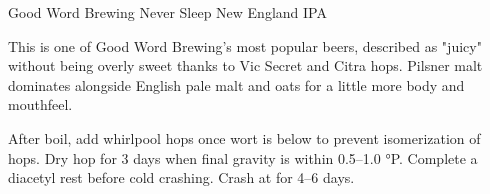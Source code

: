 \begin{recipie}{Good Word Brewing Never Sleep New England IPA}

\begin{aboutblock}
This is one of Good Word Brewing's most popular beers, described as "juicy" without
being overly sweet thanks to Vic Secret and Citra hops. Pilsner malt dominates
alongside English pale malt and oats for a little more body and mouthfeel.
\end{aboutblock}


\begin{methodandtiming}
 
\begin{mashsteps}
\end{mashsteps}

\begin{fermentationsteps}
\end{fermentationsteps}

\begin{directions}
After boil, add whirlpool hops once wort is below  to prevent isomerization
of hops. Dry hop for 3 days when final gravity is within 0.5--1.0 °P. Complete a
diacetyl rest before cold crashing. Crash at  for 4--6 days.
\end{directions}

\end{methodandtiming}

\pagebreak

\begin{ingredientsblock}

\begin{malts}
\end{malts}

\begin{hops}
\end{hops}

\begin{yeasts}
\end{yeasts}

\end{ingredientsblock}

\end{recipie}

